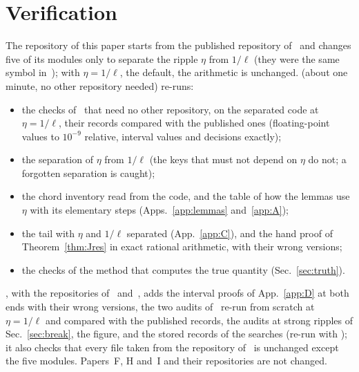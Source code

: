 \section{Verification}
\label{app:E}

The repository of this paper starts from the published repository of~\cite{I} and changes five of its modules only to separate the ripple $\eta$ from $1/\ell$ (they were the same symbol in~\cite{I}); with $\eta=1/\ell$, the default, the arithmetic is unchanged.
 (about one minute, no other repository needed) re-runs:
\begin{itemize}
\item the checks of~\cite{I} that need no other repository, on the separated code at $\eta=1/\ell$, their records compared with the published ones (floating-point values to $10^{-9}$ relative, interval values and decisions exactly);
\item the separation of $\eta$ from $1/\ell$ (the keys that must not depend on $\eta$ do not; a forgotten separation is caught);
\item the chord inventory read from the code, and the table of how the lemmas use $\eta$ with its elementary steps (Apps.~\ref{app:lemmas} and~\ref{app:A});
\item the tail with $\eta$ and $1/\ell$ separated (App.~\ref{app:C}), and the hand proof of Theorem~\ref{thm:Jres} in exact rational arithmetic, with their wrong versions;
\item the checks of the method that computes the true quantity (Sec.~\ref{sec:truth}).
\end{itemize}
, with the repositories of~\cite{H} and~\cite{I}, adds the interval proofs of App.~\ref{app:D} at both ends with their wrong versions, the two audits of~\cite{I} re-run from scratch at $\eta=1/\ell$ and compared with the published records, the audits at strong ripples of Sec.~\ref{sec:break}, the figure, and the stored records of the searches (re-run with ); it also checks that every file taken from the repository of~\cite{I} is unchanged except the five modules.
Papers~F, H and~I and their repositories are not changed.
